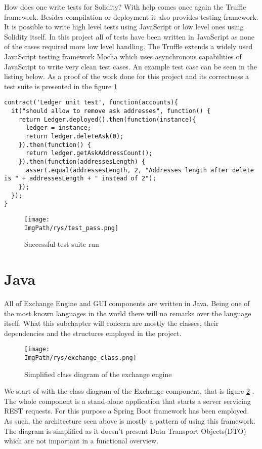 \documentclass[a4paper,12pt,twoside,openany]{report}
\newcommand{\ImgPath}{.}
\begin{document}
How does one write tests for Solidity? With help comes once again the Truffle framework. Besides compilation or deployment it also provides testing framework. It is possible to write high level tests using JavaScript or low level ones using Solidity itself. In this project all of tests have been written in JavaScript as none of the cases required more low level handling. The Truffle extends a widely used JavaScript testing framework Mocha which uses asynchronous capabilities of JavaScript to write very clean test cases. An example test case can be seen in the listing below. As a proof of the work done for this project and its correctness a test suite is presented in the figure \ref{tests}

\begin{lstlisting}
contract('Ledger unit test', function(accounts){
  it("should allow to remove ask addresses", function() {
    return Ledger.deployed().then(function(instance){
      ledger = instance;
      return ledger.deleteAsk(0);
    }).then(function() {
      return ledger.getAskAddressCount();
    }).then(function(addressesLength) {
      assert.equal(addressesLength, 2, "Addresses length after delete is " + addressesLength + " instead of 2");
    });
  });
}
\end{lstlisting}

\begin{figure}[!htbp]
	\begin{center}
\centering
\texttt{[image: \\ImgPath/rys/test\_pass.png]}
\end{center}
	\caption{Successful test suite run}
	\label{tests}
\end{figure}

\newpage

\section{Java}

All of Exchange Engine and GUI components are written in Java. Being one of the most known languages in the world there will no remarks over the language itself. What this subchapter will concern are mostly the classes, their dependencies and the structures employed in the project.

\begin{figure}[!htbp]
	\begin{center}
\centering
\texttt{[image: \\ImgPath/rys/exchange\_class.png]}
\end{center}
	\caption{Simplified class diagram of the exchange engine}
	\label{engine class}
\end{figure}
\newpage
We start of with the class diagram of the Exchange component, that is figure \ref{engine class} . The whole component is a stand-alone application that starts a server servicing REST requests. For this purpose a Spring Boot framework has been employed. As such, the architecture seen above is mostly a pattern of using this framework. The diagram is simplified as it doesn't present Data Transport Objects(DTO) which are not important in a functional overview.
\end{document}
